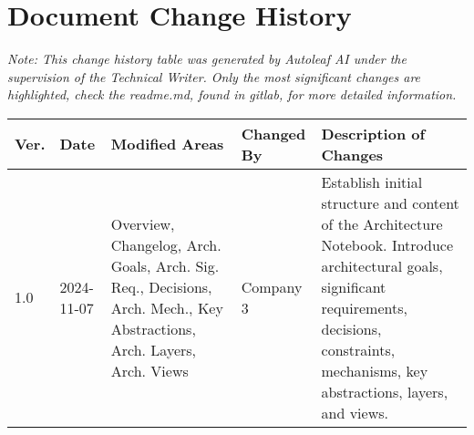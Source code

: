 \section{Document Change History}

\begin{center}
\small\textit{Note: This change history table was generated by Autoleaf AI under the supervision of the Technical Writer. Only the most significant changes are highlighted, check the readme.md, found in gitlab, for more detailed information.}

\vspace{0.5cm}

\begin{tabular}{|p{}|p{}|p{}|p{}|p{}|}
\hline
\textbf{Ver.} & \textbf{Date} & \textbf{Modified Areas} & \textbf{Changed By} & \textbf{Description of Changes} \\
\hline
1.0 & 2024-11-07 & Overview, Changelog, Arch. Goals, Arch. Sig. Req., Decisions, Arch. Mech., Key Abstractions, Arch. Layers, Arch. Views & Company 3 & Establish initial structure and content of the Architecture Notebook. Introduce architectural goals, significant requirements, decisions, constraints, mechanisms, key abstractions, layers, and views. \\
\hline
\end{tabular}
\end{center}

\vspace{1cm}
